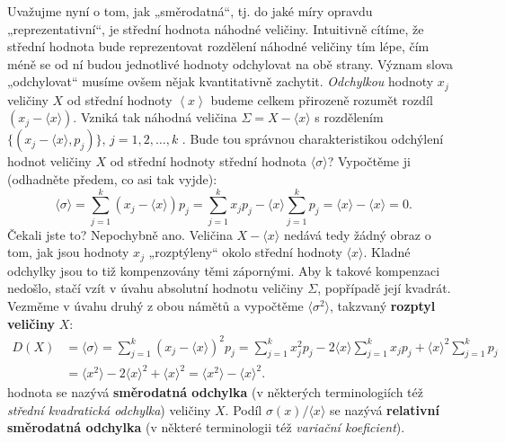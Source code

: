     Uvažujme nyní o tom, jak „směrodatná“, tj. do jaké míry opravdu „reprezentativní“, je
    střední hodnota náhodné veličiny. Intuitivně cítíme, že střední hodnota bude reprezentovat
    rozdělení náhodné veličiny tím lépe, čím méně se od ní budou jednotlivé hodnoty odchylovat na 
    obě strany. Význam slova „odchylovat“ musíme ovšem nějak kvantitativně zachytit.
    \emph{Odchylkou} hodnoty \(x_j\) veličiny \(X\) od střední hodnoty \(\left\langle x 
    \right\rangle\) budeme celkem přirozeně rozumět rozdíl \((x_j - \langle x\rangle)\). Vzniká tak 
    náhodná veličina \(\Sigma = X - \langle x \rangle\) s rozdělením \(\{(x_j - \langle x\rangle, 
    p_j)\}\), \(j = 1, 2, \ldots, k\) . Bude tou správnou charakteristikou odchýlení hodnot 
    veličiny \(X\) od střední hodnoty střední hodnota \(\langle\sigma\rangle\)? Vypočtěme ji 
    (odhadněte předem, co asi tak vyjde):
    \begin{equation*}
      \langle\sigma\rangle = \sum_{j=1}^{k}(x_j - \langle x\rangle)p_j
        = \sum_{j=1}^{k}x_jp_j - \langle x\rangle\sum_{j=1}^{k}p_j
        = \langle x\rangle - \langle x\rangle = 0.
    \end{equation*}
    Čekali jste to? Nepochybně ano. Veličina \(X - \langle x\rangle \) nedává tedy žádný obraz o 
    tom, jak jsou hodnoty \(x_j\) „rozptýleny“ okolo střední hodnoty \(\langle x\rangle\). Kladné 
    odchylky jsou to tiž kompenzovány těmi zápornými. Aby k takové kompenzaci nedošlo, stačí vzít 
    v úvahu absolutní hodnotu veličiny \(\Sigma\), popřípadě její kvadrát. Vezměme v úvahu druhý z 
    obou námětů a vypočtěme \(\langle \sigma^2\rangle\), takzvaný \textbf{rozptyl veličiny} \(X\):
    \begin{align}\label{mai:eq061}
      D(X) &= \langle \sigma\rangle = \sum_{j=1}^{k}(x_j - \langle x\rangle)^2p_j
            = \sum_{j=1}^{k}x_j^2p_j - 2\langle x\rangle\sum_{j=1}^{k}x_jp_j 
            + \langle x\rangle^2\sum_{j=1}^{k}p_j                                     \nonumber \\
           &= \langle x^2\rangle - 2\langle x\rangle^2 + \langle x\rangle^2 
            = \langle x^2\rangle - \langle x\rangle^2.
    \end{align}
    hodnota
    se nazývá \textbf{směrodatná odchylka} (v některých terminologiích též \emph{střední 
    kvadratická odchylka}) veličiny \(X\). Podíl \(\sigma(x)/ \langle x\rangle\) se nazývá 
    \textbf{relativní směrodatná odchylka} (v některé terminologii též \emph{variační koeficient}).


